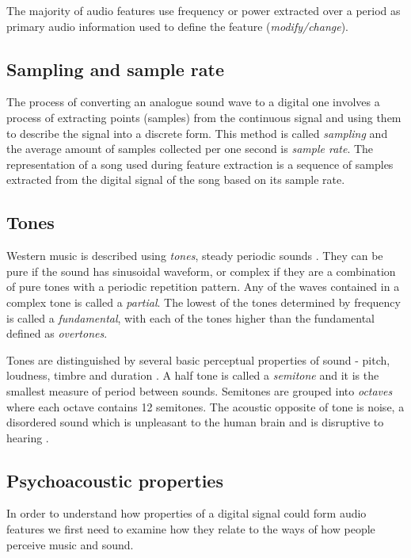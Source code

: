 The majority of audio features use frequency or power extracted over a period as
primary audio information used to define the feature (\textit{modify/change}). 

\subsection{Sampling and sample rate}
\label{subsec:sampling}
The process of converting an analogue sound wave to a digital one involves a
process of extracting points (samples) from the continuous signal and using them
to describe the signal into a discrete form. This method is called
\textit{sampling} and the average amount of samples collected per one second is
\textit{sample rate}. The representation of a song used during feature
extraction is a sequence of samples extracted from the digital signal of the
song based on its sample rate.

\subsection{Tones}
\label{subsec:tones}
Western music is described using \textit{tones}, steady periodic sounds
\cite{wiki:tone}. They can be pure if the sound has sinusoidal waveform, or
complex if they are a combination of pure tones with a periodic repetition
pattern. Any of the waves contained in a complex tone is called a
\textit{partial}. The lowest of the tones determined by frequency is called a
\textit{fundamental}, with each of the tones higher than the fundamental defined
as \textit{overtones}. 

Tones are distinguished by several basic perceptual properties of sound - pitch,
loudness, timbre and duration \cite{acoustic-glossary-power}. A half tone is
called a \textit{semitone} and it is the smallest measure of period between
sounds. Semitones are grouped into \textit{octaves} where each octave contains
12 semitones. The acoustic opposite of tone is noise, a disordered sound which
is unpleasant to the human brain and is disruptive to hearing
\cite{music-noise}. 

\subsection{Psychoacoustic properties}
\label{subsec:psychoacoustic}
In order to understand how properties of a digital signal could form audio
features we first need to examine how they relate to the ways of how people
perceive music and sound. 

